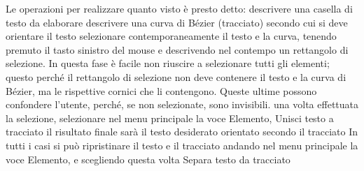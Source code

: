 \documentclass[a4paper, 12pt]{book}
\begin{document}
Le operazioni per realizzare quanto visto è presto detto:
descrivere una casella di testo da elaborare
descrivere una curva di Bézier (tracciato) secondo cui si deve orientare il testo
selezionare contemporaneamente il testo e la curva, tenendo premuto il tasto sinistro del mouse e descrivendo nel contempo un rettangolo di selezione. In questa fase è facile non riuscire a selezionare tutti gli elementi; questo perché il rettangolo di selezione non deve contenere il testo e la curva di Bézier, ma le rispettive cornici che li contengono. Queste ultime possono confondere l'utente, perché, se non selezionate, sono invisibili.
una volta effettuata la selezione, selezionare nel menu principale la voce Elemento, Unisci testo a tracciato
il risultato finale sarà il testo desiderato orientato secondo il tracciato
In tutti i casi si può ripristinare il testo e il tracciato andando nel menu principale la voce Elemento, e scegliendo questa volta Separa testo da tracciato
\end{document}
